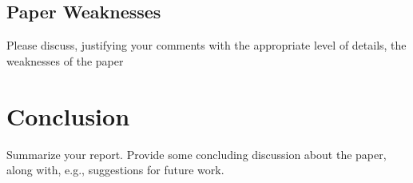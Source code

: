 \documentclass[12pt]{scrartcl}
\begin{document}
\subsection{Paper Weaknesses} %
\label{sub:paper_weaknesses}
Please discuss, justifying your comments with the appropriate level of details, the weaknesses of the paper


\section{Conclusion}
Summarize your report.
Provide some concluding discussion about the paper, along with, e.g., suggestions for future work.


\newpage
\printbibliography
{}%
\end{document}
